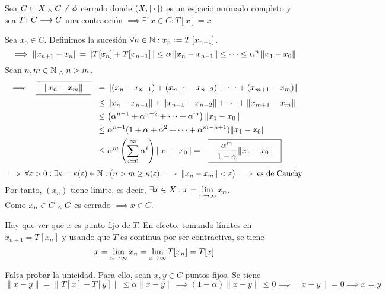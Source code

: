 \begin{teo}
	Sea $C \subset X \; _{\wedge} \; C\ne \phi$ cerrado donde $(X, \left\Vert\cdot\right\Vert)$ es un espacio normado completo y sea $T \colon C \longrightarrow C$ una contracción $\implies \exists!\,x\in C : T[x]=x$
	\begin{dem}
		Sea $x_0 \in C$. Definimos la sucesión $\forall n \in \mathbb{N} : x_n\vcentcolon= T\left[x_{n-1}\right]$.
		\[\implies \left\Vert x_{n+1}-x_n\right\Vert = \left\Vert T[x_n]+T[x_{n-1}]\right\Vert \leq \alpha \left\Vert x_n - x_{n-1}\right\Vert \leq \dots \leq \alpha^n \left\Vert x_1-x_0\right\Vert\]
		Sean $n,m \in \mathbb{N} \; _{\wedge} \; n>m$.
		\[\begin{aligned}
				\implies \lbox{\|x_n-x_m\|} & = \|(x_n-x_{n-1}) + (x_{n-1}-x_{n-2}) + \dots + (x_{m+1}-x_m)\|                                                            \\
				                            & \leq \|x_n-x_{n-1}\| + \|x_{n-1}-x_{n-2}\| + \dots + \| x_{m+1}-x_m\|                                                      \\
				                            & \leq \left(\alpha ^{n-1} + \alpha^{n-2} + \dots + \alpha^m \right) \|x_1-x_0\|                                             \\
				                            & \leq \alpha ^{n-1} (1+\alpha + \alpha ^2 + \dots + \alpha ^{m-n+1} ) \|x_1-x_0\|                                           \\
				                            & \leq \alpha^m \ds \left(\sum _{i=0}^{\infty} \alpha^i\right) \|x_1-x_0\| = \rbox{\ds \frac{\alpha^m}{1-\alpha}\|x_1-x_0\|}
			\end{aligned}\]
		\[\implies \forall \varepsilon >0 : \exists \kappa = \kappa (\varepsilon ) \in \mathbb{N} : \big(n>m \geq \kappa (\varepsilon )\implies \|x_n-x_m\| < \varepsilon\big) \implies \text{es de Cauchy}\]
		Por tanto, $\left(x_n\right)$ tiene límite, es decir, $\displaystyle \exists x \in X : x = \lim_{n\to \infty} x_n$.\\
		Como $x_n \in C\; _{\wedge} \; C$ es cerrado $\implies x \in C$.

		Hay que ver que $x$ es punto fijo de $T$. En efecto, tomando límites en $x_{n+1}=T[x_n]$ y usando que $T$ es continua por ser contractiva, se tiene
		\[x = \displaystyle \lim_{n \to \infty} x_n = \displaystyle \lim_{x \to \infty} T[x_n] = T[x]\]

		Falta probar la unicidad. Para ello, sean $x,y \in C$ puntos fijos. Se tiene
		\[\|x-y\|=\|T[x]-T[y]\|\leq \alpha \|x-y\| \implies (1-\alpha)\|x-y\| \leq 0 \implies \|x-y\|= 0 \implies x=y\]
	\end{dem}
\end{teo}

